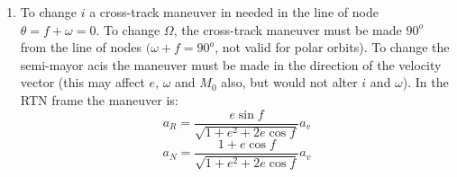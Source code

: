 \documentclass[a4paper]{article}
\begin{document}
\begin{enumerate}[label=\emph{\alph*)}]
  \item %
    To change $i$ a cross-track maneuver in needed in the line of node $\theta = f + \omega = 0$. To change $\Omega$, the cross-track maneuver must be made $90^o$ from the line of nodes $(\omega+f=90^o$, not valid for polar orbits). To change the semi-mayor acis the maneuver must be made in the direction of the velocity vector (this may affect $e$, $\omega$ and $M_0$ also, but would not alter $i$ and $\omega$). In the RTN frame the maneuver is:
    \[a_R = \frac{e\sin{f}}{\sqrt{1+e^2+2e\cos{f}}} a_v \]
    \[a_N = \frac{1+ e\cos{f}}{\sqrt{1+e^2+2e\cos{f}}} a_v \]

\end{enumerate}
\end{document}
